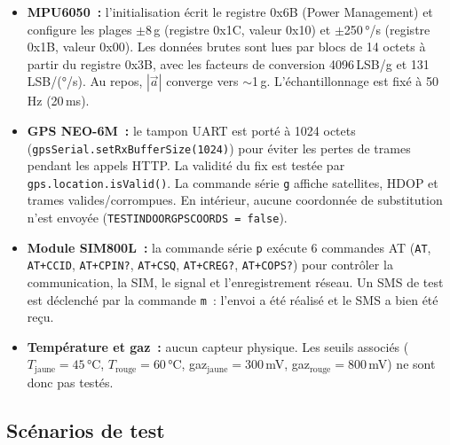 \documentclass[12pt,a4paper]{article}
\renewcommand{\_}{\textunderscore\allowbreak}
\begin{document}
\begin{itemize}
    \item \textbf{MPU6050~:} l'initialisation écrit le registre 0x6B (Power Management) et configure les plages $\pm$8\,g (registre 0x1C, valeur 0x10) et $\pm$250\,°/s (registre 0x1B, valeur 0x00). Les données brutes sont lues par blocs de 14 octets à partir du registre 0x3B, avec les facteurs de conversion 4096\,LSB/g et 131\,LSB/(°/s). Au repos, $|\vec{a}|$ converge vers $\sim$1\,g. L'échantillonnage est fixé à 50\,Hz (20\,ms).

    \item \textbf{GPS NEO-6M~:} le tampon UART est porté à 1024 octets (\texttt{gpsSerial.\allowbreak setRxBufferSize\allowbreak(1024)}) pour éviter les pertes de trames pendant les appels HTTP. La validité du fix est testée par \texttt{gps.location.isValid()}. La commande série \texttt{g} affiche satellites, HDOP et trames valides/corrompues. En intérieur, aucune coordonnée de substitution n'est envoyée (\texttt{TEST\_INDOOR\_GPS\_COORDS~=~false}).

    \item \textbf{Module SIM800L~:} la commande série \texttt{p} exécute 6 commandes AT (\texttt{AT}, \texttt{AT+CCID}, \texttt{AT+CPIN?}, \texttt{AT+CSQ}, \texttt{AT+CREG?}, \texttt{AT+COPS?}) pour contrôler la communication, la SIM, le signal et l'enregistrement réseau. Un SMS de test est déclenché par la commande \texttt{m}~: l'envoi a été réalisé et le SMS a bien été reçu.

    \item \textbf{Température et gaz~:} aucun capteur physique. Les seuils associés ($T_{\text{jaune}} = 45$\,°C, $T_{\text{rouge}} = 60$\,°C, gaz$_{\text{jaune}} = 300$\,mV, gaz$_{\text{rouge}} = 800$\,mV) ne sont donc pas testés.
\end{itemize}

\subsection{Scénarios de test}
\end{document}
